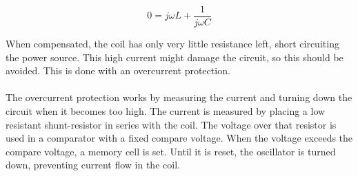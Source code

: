 \documentclass[final]{scrreprt} %
\begin{document}
\begin{equation}
	0 = j \omega L + \frac{1}{j \omega C}
	\label{eq:cap}
\end{equation}

When compensated, the coil has only very little resistance left, short circuiting the power source. This high current might damage the circuit, so this should be avoided. This is done with an overcurrent protection.
\\ \\
The overcurrent protection works by measuring the current and turning down the circuit when it becomes too high. The current is measured by placing a low resistant shunt-resistor in series with the coil. The voltage over that resistor is used in a comparator with a fixed compare voltage. When the voltage exceeds the compare voltage, a memory cell is set. Until it is reset, the oscillator is turned down, preventing current flow in the coil.
\end{document}
